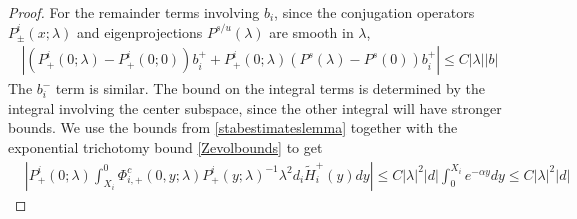 \documentclass[thesis.tex]{subfiles}
\begin{document}
\begin{lemma}
\begin{proof}
For the remainder terms involving $b_i$, since the conjugation operators $P^i_\pm(x; \lambda)$ and eigenprojections $P^{s/u}(\lambda)$ are smooth in $\lambda$, 
\begin{align*}
|(P^i_+(0; \lambda) - P^i_+(0; 0))b_i^+ + P^i_+(0; \lambda) (P^s(\lambda) - P^s(0)) b_i^+| \leq C |\lambda| |b|
\end{align*}
The $b_i^-$ term is similar. The bound on the integral terms is determined by the integral involving the center subspace, since the other integral will have stronger bounds. We use the bounds from \cref{stabestimateslemma} together with the exponential trichotomy bound \cref{Zevolbounds} to get
\begin{align*}
&\left| P^i_+(0; \lambda) \int_{X_i}^0 \Phi^c_{i,+}(0, y; \lambda) P^i_+(y; \lambda)^{-1} \lambda^2 d_i \tilde{H}_i^+(y) dy \right| \leq C |\lambda|^2 |d| \int_0^{X_i} e^{-\alpha y} dy \leq C |\lambda|^2 |d|
\end{align*}


\end{proof}
\end{lemma}
\end{document}
